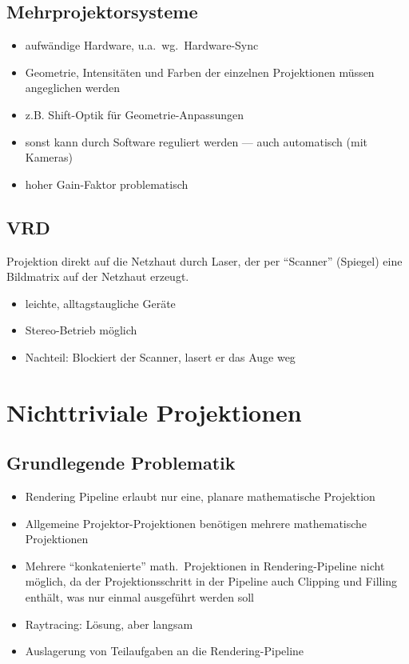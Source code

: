 \documentclass[a4paper, 12pt]{article}
\begin{document}
\subsection{Mehrprojektorsysteme}
\begin{itemize}
  \item aufwändige Hardware, u.a.\ wg.\ Hardware-Sync
  \item Geometrie, Intensitäten und Farben der einzelnen Projektionen müssen angeglichen werden
  \item z.B. Shift-Optik für Geometrie-Anpassungen
  \item sonst kann durch Software reguliert werden --- auch automatisch (mit Kameras)
  \item hoher Gain-Faktor problematisch
\end{itemize}


\subsection{VRD}
Projektion direkt auf die Netzhaut durch Laser, der per ``Scanner'' (Spiegel) eine Bildmatrix auf der Netzhaut erzeugt.
\begin{itemize}
  \item leichte, alltagstaugliche Geräte
  \item Stereo-Betrieb möglich
  \item Nachteil: Blockiert der Scanner, lasert er das Auge weg
\end{itemize}



\section{Nichttriviale Projektionen}


\subsection{Grundlegende Problematik}
\begin{itemize}
  \item Rendering Pipeline erlaubt nur eine, planare mathematische Projektion
  \item Allgemeine Projektor-Projektionen benötigen mehrere mathematische Projektionen
  \item Mehrere ``konkatenierte'' math.\ Projektionen in Rendering-Pipeline nicht möglich, da der Projektionsschritt in der Pipeline auch Clipping und Filling enthält, was nur einmal ausgeführt werden soll
  \item Raytracing: Lösung, aber langsam
  \item Auslagerung von Teilaufgaben an die Rendering-Pipeline
\end{itemize}
\end{document}
